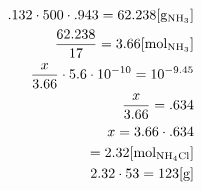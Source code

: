 \documentclass[12pt]{article}
\begin{document}
\begin{enumerate}
    \begin{equation}
      \begin{split}
        .132\cdot500\cdot.943=62.238[\si{\gram}_{\ce{NH3}}]\\
        \frac{62.238}{17}=3.66[\si{\mole}_{\ce{NH3}}]\\
        \frac{x}{3.66}\cdot5.6\cdot10^{-10}=10^{-9.45}\\
        \frac{x}{3.66}=.634\\
        x=3.66\cdot.634\\
        =2.32[\si{\mole}_{\ce{NH4Cl}}]\\
        2.32\cdot53=123[\si{\gram}]\\
      \end{split}
      \label{12}
    \end{equation}

\end{enumerate}
\end{document}
